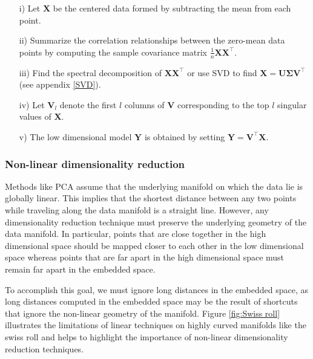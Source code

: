 \begin{itemize}
\item[i)] Let $\textbf{X}$ be the centered data formed by subtracting the mean from each point.
\item[ii)] Summarize the correlation relationships between the zero-mean data points by computing the sample covariance matrix $\frac{1}{n}\textbf{XX}^{\top}.$
\item[iii)] Find the spectral decomposition of $\textbf{XX}^{\top}$ or 
use SVD to find $\textbf{X} = \bm{U\Sigma V^{\top}}$  (see appendix \ref{SVD}).
\item[iv)] Let $\bm{V}_{l}$ denote the first $l$ columns of $\textbf{V}$ corresponding to the  top $l$ singular values of $\textbf{X}$.
\item[v)] The low dimensional model $\textbf{Y}$ is obtained by setting 
$\textbf{Y} = \textbf{V}^{\top}\textbf{X}$.
\end{itemize}

\subsubsection{Non-linear dimensionality reduction} 
Methods like PCA assume that the underlying manifold on which the data lie is globally linear. This implies that the shortest distance between any two points while traveling along the data manifold is a straight line.
However, any dimensionality reduction technique must preserve the underlying geometry of the data manifold. In particular, points that are close together in the high dimensional space should be mapped closer to each other in the low dimensional space whereas points that are far apart in the high dimensional space must remain far apart in the embedded space.


To accomplish this goal, we must ignore long distances in the embedded space, as long distances computed in the embedded space may be the result of shortcuts that ignore the non-linear geometry of the manifold.
Figure \ref{fig:Swiss roll} illustrates the limitations of linear techniques on highly curved manifolds like the swiss roll and helps to highlight the importance of non-linear dimensionality reduction techniques.

